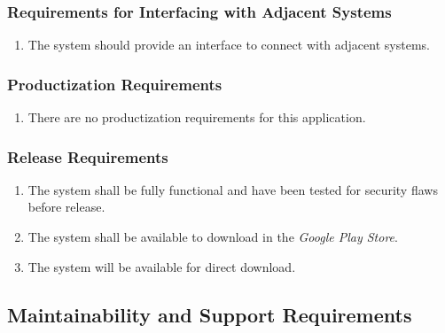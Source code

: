 \documentclass[titlepage]{article}
\newcounter{req}
\begin{document}
		\subsubsection{Requirements for Interfacing with Adjacent Systems}
		\label{ssub:requirements_for_interfacing_with_adjacent_systems}
		\begin{enumerate}[{OE}1. ]
		\setcounter{enumi}{\value{req}}
			\item 
			The system should provide an interface to connect with adjacent systems.
		\setcounter{req}{\theenumi}
		\end{enumerate}
		
		\subsubsection{Productization Requirements}
		\label{ssub:productization_requirements}
		\begin{enumerate}[{OE}1. ]
		\setcounter{enumi}{\value{req}}
			\item There are no productization requirements for this application.
		\setcounter{req}{\theenumi}
		\end{enumerate}
		
		\subsubsection{Release Requirements}
		\label{ssub:release_requirements}
		\begin{enumerate}[{OE}1. ]
		\setcounter{enumi}{\value{req}}
			\item The system shall be fully functional and have been tested for security flaws before release.
			\item The system shall be available to download in the \textit{Google Play Store}.
			\item The system will be available for direct download.
		\setcounter{req}{\theenumi}
		\end{enumerate}
		
		
		\subsection{Maintainability and Support Requirements}
		\setcounter{req}{0}
		\label{sub:maintainability_and_support_requirements}
\end{document}
